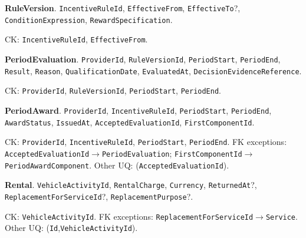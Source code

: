 \par\vspace{2.0pt}\noindent\textbf{RuleVersion}. \texttt{Incentive\allowbreak{}Rule\allowbreak{}Id}, \texttt{Effective\allowbreak{}From}, \texttt{Effective\allowbreak{}To}?, \texttt{Condition\allowbreak{}Expression}, \texttt{Reward\allowbreak{}Specification}.\par\noindent CK: \texttt{Incentive\allowbreak{}Rule\allowbreak{}Id}, \texttt{Effective\allowbreak{}From}.
\par\vspace{2.0pt}\noindent\textbf{PeriodEvaluation}. \texttt{Provider\allowbreak{}Id}, \texttt{Rule\allowbreak{}Version\allowbreak{}Id}, \texttt{Period\allowbreak{}Start}, \texttt{Period\allowbreak{}End}, \texttt{Result}, \texttt{Reason}, \texttt{Qualification\allowbreak{}Date}, \texttt{Evaluated\allowbreak{}At}, \texttt{Decision\allowbreak{}Evidence\allowbreak{}Reference}.\par\noindent CK: \texttt{Provider\allowbreak{}Id}, \texttt{Rule\allowbreak{}Version\allowbreak{}Id}, \texttt{Period\allowbreak{}Start}, \texttt{Period\allowbreak{}End}.
\par\vspace{2.0pt}\noindent\textbf{PeriodAward}. \texttt{Provider\allowbreak{}Id}, \texttt{Incentive\allowbreak{}Rule\allowbreak{}Id}, \texttt{Period\allowbreak{}Start}, \texttt{Period\allowbreak{}End}, \texttt{Award\allowbreak{}Status}, \texttt{Issued\allowbreak{}At}, \texttt{Accepted\allowbreak{}Evaluation\allowbreak{}Id}, \texttt{First\allowbreak{}Component\allowbreak{}Id}.\par\noindent CK: \texttt{Provider\allowbreak{}Id}, \texttt{Incentive\allowbreak{}Rule\allowbreak{}Id}, \texttt{Period\allowbreak{}Start}, \texttt{Period\allowbreak{}End}. FK exceptions: \texttt{Accepted\allowbreak{}Evaluation\allowbreak{}Id}$\to$\texttt{Period\allowbreak{}Evaluation}; \texttt{First\allowbreak{}Component\allowbreak{}Id}$\to$\texttt{Period\allowbreak{}Award\allowbreak{}Component}. Other UQ: (\texttt{Accepted\allowbreak{}Evaluation\allowbreak{}Id}).
\par\vspace{2.0pt}\noindent\textbf{Rental}. \texttt{Vehicle\allowbreak{}Activity\allowbreak{}Id}, \texttt{Rental\allowbreak{}Charge}, \texttt{Currency}, \texttt{Returned\allowbreak{}At}?, \texttt{Replacement\allowbreak{}For\allowbreak{}Service\allowbreak{}Id}?, \texttt{Replacement\allowbreak{}Purpose}?.\par\noindent CK: \texttt{Vehicle\allowbreak{}Activity\allowbreak{}Id}. FK exceptions: \texttt{Replacement\allowbreak{}For\allowbreak{}Service\allowbreak{}Id}$\to$\texttt{Service}. Other UQ: (\texttt{Id},\texttt{Vehicle\allowbreak{}Activity\allowbreak{}Id}).
